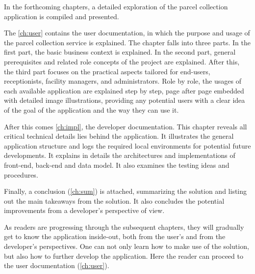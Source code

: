 In the forthcoming chapters, a detailed exploration of the parcel collection application is compiled and presented. 

The \autoref{ch:user} contains the user documentation, in which the purpose and usage of the parcel collection service is explained. The chapter falls into three parts. In the first part, the basic business context is explained. In the second part, general prerequisites and related role concepts of the project are explained. After this, the third part focuses on the practical aspects tailored for end-users, receptionists, facility managers, and administrators. Role by role, the usages of each available application are explained step by step, page after page embedded with detailed image illustrations, providing any potential users with a clear idea of the goal of the application and the way they can use it. 

After this comes \autoref{ch:impl}, the developer documentation. This chapter reveals all critical technical details lies behind the application. It illustrates the general application structure and logs the required local environments for potential future developments. It explains in details the architectures and implementations of front-end, back-end and data model. It also examines the testing ideas and procedures. 

Finally, a conclusion (\autoref{ch:sum}) is attached, summarizing the solution and listing out the main takeaways from the solution. It also concludes the potential improvements from a developer's perspective of view.

As readers are progressing through the subsequent chapters, they will gradually get to know the application inside-out, both from the user's and from the developer's perspectives. One can not only learn how to make use of the solution, but also how to further develop the application.
Here the reader can proceed to the user documentation (\autoref{ch:user}).




